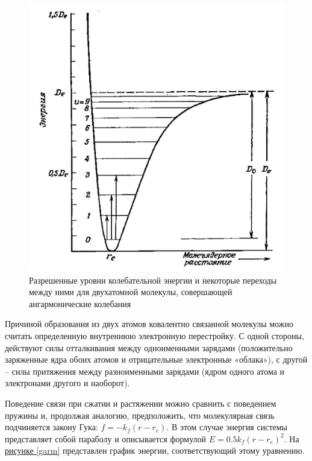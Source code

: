 \documentclass{article}
\begin{document}
\begin{figure}[h]
\begin{center}
\begin{minipage}[h]{0.4\linewidth}
\includegraphics[width=1\linewidth]{Screenshot 2024-02-17 at 3.51.57 PM.png}
\caption{Разрешенные уровни колебательной энергии и некоторые переходы между ними для двухатомной молекулы, совершающей 
ангармонические колебания} %
\label{agarm}
\end{minipage}


\end{center}
\end{figure}
 Причиной образования из двух атомов ковалентно связанной молекулы можно считать определенную внутреннюю электронную перестройку. С одной стороны, действуют силы отталкивания между одноименными зарядами (положительно заряженные ядра обоих атомов и отрицательные электронные «облака»), с другой – силы притяжения между разноименными зарядами (ядром одного атома и электронами другого и наоборот). 

Поведение связи при сжатии и растяжении можно сравнить с поведением  пружины  и,  продолжая  аналогию,  предположить,  что молекулярная связь подчиняется закону Гука: $f = −k_f (r-r_e )$. В этом случае энергия системы представляет собой параболу и описывается формулой $E = 0.5k_f (r-r_e )^2$.
На \hyperref[garm]{рисунке \ref*{garm}} представлен график энергии, соответствующий этому уравнению.
\end{document}
